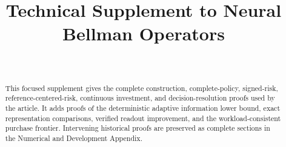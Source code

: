 \documentclass[ecta,nameyear,draft]{econsocart}
\begin{document}
\begin{frontmatter}
\title{Technical Supplement to Neural Bellman Operators}
\begin{aug}
\author[id=au1,addressref={add1}]{~}
\address[id=add1]{Peking University}
\end{aug}
\begin{abstract}
This focused supplement gives the complete construction, complete-policy, signed-risk, reference-centered-risk, continuous investment, and decision-resolution proofs used by the article. It adds proofs of the deterministic adaptive information lower bound, exact representation comparisons, verified readout improvement, and the workload-consistent purchase frontier. Intervening historical proofs are preserved as complete sections in the Numerical and Development Appendix.
\end{abstract}
\end{frontmatter}









\end{document}
